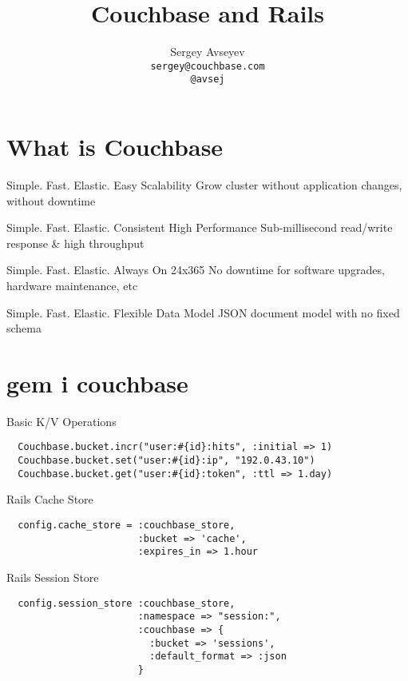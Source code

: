 \documentclass[aspectratio=43,handout]{beamer}
\title{Couchbase and Rails}
\author{Sergey Avseyev\\\texttt{sergey@couchbase.com}\\\texttt{@avsej}}
\begin{document}
\titleback
\begin{frame}
  \titlepage
\end{frame}

\section{What is Couchbase}

\begin{frame}{Simple. Fast. Elastic.}
  \claim
    {Easy Scalability}
    {Grow cluster without application changes, without downtime}
\end{frame}

\begin{frame}{Simple. Fast. Elastic.}
  \claim
    {Consistent High Performance}
    {Sub-millisecond read/write response \& high throughput}
\end{frame}

\begin{frame}{Simple. Fast. Elastic.}
  \claim
    {Always On 24x365}
    {No downtime for software upgrades, hardware maintenance, etc}
\end{frame}

\begin{frame}{Simple. Fast. Elastic.}
  \claim
    {Flexible Data Model}
    {JSON document model with no fixed schema}
\end{frame}

\section{gem i couchbase}
\begin{frame}[fragile]{Basic K/V Operations}
  \begin{verbatim}
  Couchbase.bucket.incr("user:#{id}:hits", :initial => 1)
  Couchbase.bucket.set("user:#{id}:ip", "192.0.43.10")
  Couchbase.bucket.get("user:#{id}:token", :ttl => 1.day)
  \end{verbatim}
\end{frame}

\begin{frame}[fragile]{Rails Cache Store}
  \begin{verbatim}
  config.cache_store = :couchbase_store,
                       :bucket => 'cache',
                       :expires_in => 1.hour
  \end{verbatim}
\end{frame}

\begin{frame}[fragile]{Rails Session Store}
  \begin{verbatim}
  config.session_store :couchbase_store,
                       :namespace => "session:",
                       :couchbase => {
                         :bucket => 'sessions',
                         :default_format => :json
                       }
  \end{verbatim}
\end{frame}
\end{document}

